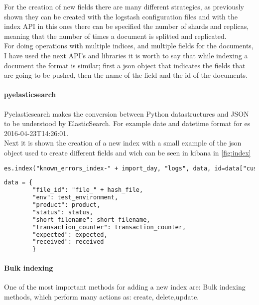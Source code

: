 For the creation of new fields there are many different strategies, as previously shown they can be created with the logstash configuration files and with the index API in this ones there can be specified the number of shards and replicas, meaning that the number of times a document is splitted and replicated.
\\

For doing operations with multiple indices, and multiple fields for the documents, I have used the next API's and libraries it is worth to say that while indexing a document the format is similar; first a json object that indicates the fields that are going to be pushed, then the name of the field and the id of the documents. 

\paragraph{pyelasticsearch} Pyelasticsearch makes the conversion between Python datastructures and JSON to be understood by ElasticSearch. For example date and datetime format for es 2016-04-23T14:26:01.
\\

Next it is shown the creation of a new index with a small example of the json object used to create different fields and wich can be seen in kibana in \autoref{fig:index}
\\

\begin{lstlisting}[language=xml,frame=tb,caption={Creation of a new index}]
es.index("known_errors_index-" + import_day, "logs", data, id=data["custom_id"])
\end{lstlisting}

\begin{lstlisting}[language=xml,frame=tb,caption={Json object}]
		data = {
		"file_id": "file_" + hash_file,
		"env": test_environment,
		"product": product,
		"status": status,
		"short_filename": short_filename,
		"transaction_counter": transaction_counter,
		"expected": expected,
		"received": received
		}

\end{lstlisting}



\paragraph{Bulk indexing} One of the most important methods for adding a new index are: Bulk indexing methods, which perform many actions as: create, delete,update. 
\\

